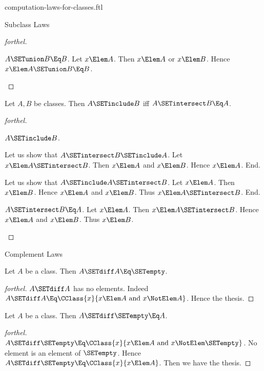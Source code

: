 \documentclass{stex}
\begin{document}
\begin{smodule}{computation-laws-for-classes.ftl}
\begin{sfragment}{Subclass Laws}
\begin{proof}[forthel]
    \begin{case}{$A \SETunion B \Eq B$.}
      Let $x \Elem A$.
      Then $x \Elem A$ or $x \Elem B$.
      Hence $x \Elem A \SETunion B \Eq B$.
    \end{case}
  \end{proof}

  \begin{proposition}[forthel]
    Let $A, B$ be classes.
    Then $A \SETinclude B$ iff $A \SETintersect B \Eq A$.
  \end{proposition}
  \begin{proof}[forthel]
    \begin{case}{$A \SETinclude B$.}

      Let us show that $A \SETintersect B \SETinclude A$.
        Let $x \Elem A \SETintersect B$.
        Then $x \Elem A$ and $x \Elem B$.
        Hence $x \Elem A$.
      End.

      Let us show that $A \SETinclude A \SETintersect B$.
        Let $x \Elem A$.
        Then $x \Elem B$.
        Hence $x \Elem A$ and $x \Elem B$.
        Thus $x \Elem A \SETintersect B$.
      End.
    \end{case}

    \begin{case}{$A \SETintersect B \Eq A$.}
      Let $x \Elem A$.
      Then $x \Elem A \SETintersect B$.
      Hence $x \Elem A$ and $x \Elem B$.
      Thus $x \Elem B$.
    \end{case}
  \end{proof}
\end{sfragment}

\begin{sfragment}{Complement Laws}
  \begin{proposition}[forthel]
    Let $A$ be a class.
    Then $A \SETdiff A \Eq \SETempty$.
  \end{proposition}
  \begin{proof}[forthel]
    $A \SETdiff A$ has no elements.
    Indeed $A \SETdiff A \Eq \CClass{x}{x \Elem A\text{ and }x \NotElem A}$.
    Hence the thesis.
  \end{proof}

  \begin{proposition}[forthel]
    Let $A$ be a class.
    Then $A \SETdiff \SETempty \Eq A$.
  \end{proposition}
  \begin{proof}[forthel]
    $A \SETdiff \SETempty \Eq \CClass{x}{x \Elem A\text{ and }x \NotElem \SETempty}$.
    No element is an element of $\SETempty$.
    Hence $A \SETdiff \SETempty \Eq \CClass{x}{x \Elem A}$.
    Then we have the thesis.
  \end{proof}


\end{sfragment}
\end{smodule}
\end{document}
